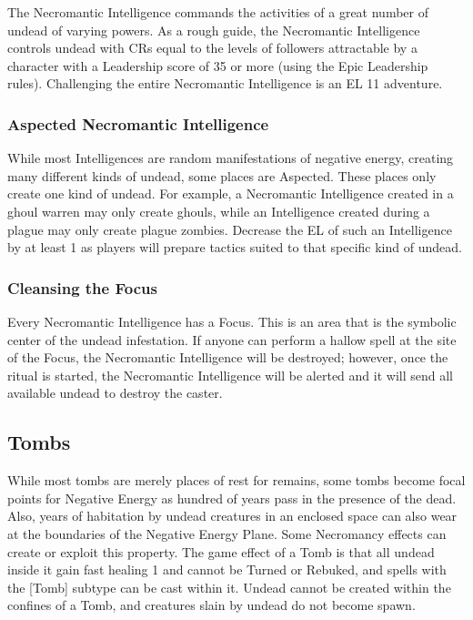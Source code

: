The Necromantic Intelligence commands the activities of a great number of undead of varying powers. As a rough guide, the Necromantic Intelligence controls undead with CRs equal to the levels of followers attractable by a character with a Leadership score of 35 or more (using the Epic Leadership rules). Challenging the entire Necromantic Intelligence is an EL 11 adventure.

\subsubsection{Aspected Necromantic Intelligence} While most Intelligences are random manifestations of negative energy, creating many different kinds of undead, some places are Aspected. These places only create one kind of undead. For example, a Necromantic Intelligence created in a ghoul warren may only create ghouls, while an Intelligence created during a plague may only create plague zombies. Decrease the EL of such an Intelligence by at least 1 as players will prepare tactics suited to that specific kind of undead.

\subsubsection{Cleansing the Focus} Every Necromantic Intelligence has a Focus. This is an area that is the symbolic center of the undead infestation. If anyone can perform a hallow spell at the site of the Focus, the Necromantic Intelligence will be destroyed; however, once the ritual is started, the Necromantic Intelligence will be alerted and it will send all available undead to destroy the caster.

\subsection{Tombs}

While most tombs are merely places of rest for remains, some tombs become focal points for Negative Energy as hundred of years pass in the presence of the dead. Also, years of habitation by undead creatures in an enclosed space can also wear at the boundaries of the Negative Energy Plane. Some Necromancy effects can create or exploit this property. The game effect of a Tomb is that all undead inside it gain fast healing 1 and cannot be Turned or Rebuked, and spells with the [Tomb] subtype can be cast within it. Undead cannot be created within the confines of a Tomb, and creatures slain by undead do not become spawn.

